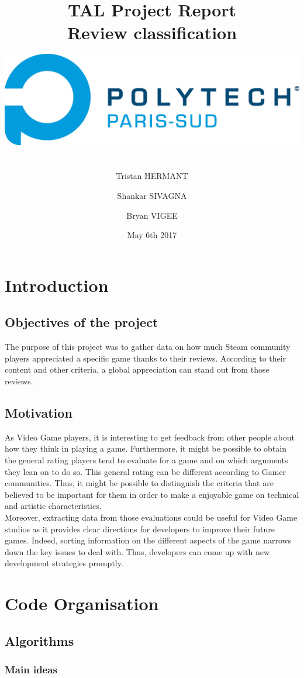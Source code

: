\documentclass[paper=a4,fontsize=12pt]{report}
\title{ \LARGE \textbf{TAL Project Report
\\Review classification} \\
\includegraphics[width=15cm,height=5cm]{POLYTECH_PARIS-SUD_RVB.jpg}}
\author{\large Tristan HERMANT
\and
Shankar SIVAGNA
\and
Bryan VIGEE}
\date{May 6th 2017}
\begin{document}
\maketitle

\tableofcontents
\setcounter{page}{1}
\chapter{Introduction}
\section{Objectives of the project}
	The purpose of this project was to gather data on how much Steam community players appreciated a specific game thanks to their reviews. According to their content and other criteria, a global appreciation can stand out from those reviews. \\

\section{Motivation}
	As Video Game players, it is interesting to get feedback from other people about how they think in playing a game. Furthermore, it might be possible to obtain the general rating players tend to evaluate for a game and on which arguments they lean on to do so.  This general rating can be different according to Gamer communities. Thus, it might be possible to distinguish the criteria that are believed to be important for them in order to make a enjoyable game on technical and artistic characteristics.
\\
	Moreover, extracting data from those evaluations could be useful for Video Game studios as it provides clear directions for developers to improve their future games. Indeed, sorting information on the different aspects of the game narrows down the key issues to deal with. Thus, developers  can come up with new development strategies promptly.


\chapter{Code Organisation}
\section{Algorithms}
\subsection{Main ideas}
\end{document}
